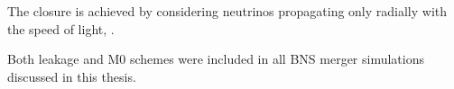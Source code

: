 %
%
%
The closure is achieved by considering neutrinos propagating only radially 
with the speed of light, %
\citep{Radice:2016dwd,Radice:2018pdn}.

Both leakage and M0 schemes were included in all \ac{BNS} merger 
simulations discussed in this thesis.

%



